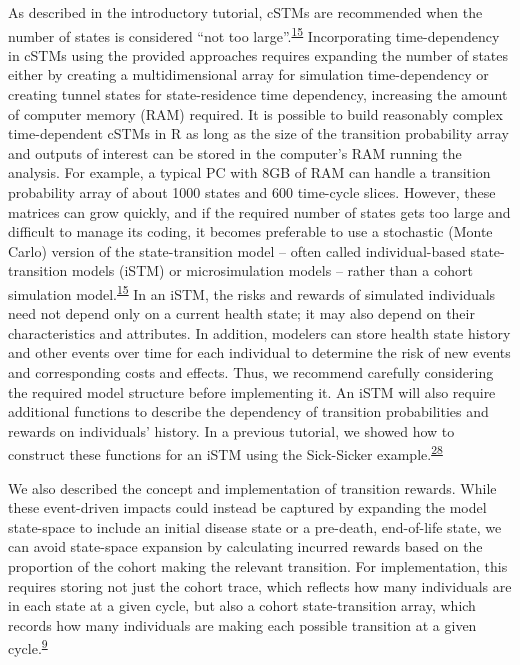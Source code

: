 \documentclass[
]{article}
\begin{document}
As described in the introductory tutorial, cSTMs are recommended when the number of states is considered ``not too large''.\textsuperscript{\protect\hyperlink{ref-Siebert2012c}{15}} Incorporating time-dependency in cSTMs using the provided approaches requires expanding the number of states either by creating a multidimensional array for simulation time-dependency or creating tunnel states for state-residence time dependency, increasing the amount of computer memory (RAM) required. It is possible to build reasonably complex time-dependent cSTMs in R as long as the size of the transition probability array and outputs of interest can be stored in the computer's RAM running the analysis. For example, a typical PC with 8GB of RAM can handle a transition probability array of about 1000 states and 600 time-cycle slices. However, these matrices can grow quickly, and if the required number of states gets too large and difficult to manage its coding, it becomes preferable to use a stochastic (Monte Carlo) version of the state-transition model -- often called individual-based state-transition models (iSTM) or microsimulation models -- rather than a cohort simulation model.\textsuperscript{\protect\hyperlink{ref-Siebert2012c}{15}} In an iSTM, the risks and rewards of simulated individuals need not depend only on a current health state; it may also depend on their characteristics and attributes. In addition, modelers can store health state history and other events over time for each individual to determine the risk of new events and corresponding costs and effects. Thus, we recommend carefully considering the required model structure before implementing it. An iSTM will also require additional functions to describe the dependency of transition probabilities and rewards on individuals' history. In a previous tutorial, we showed how to construct these functions for an iSTM using the Sick-Sicker example.\textsuperscript{\protect\hyperlink{ref-Krijkamp2018}{28}}

We also described the concept and implementation of transition rewards. While these event-driven impacts could instead be captured by expanding the model state-space to include an initial disease state or a pre-death, end-of-life state, we can avoid state-space expansion by calculating incurred rewards based on the proportion of the cohort making the relevant transition. For implementation, this requires storing not just the cohort trace, which reflects how many individuals are in each state at a given cycle, but also a cohort state-transition array, which records how many individuals are making each possible transition at a given cycle.\textsuperscript{\protect\hyperlink{ref-Krijkamp2019}{9}}
\end{document}

